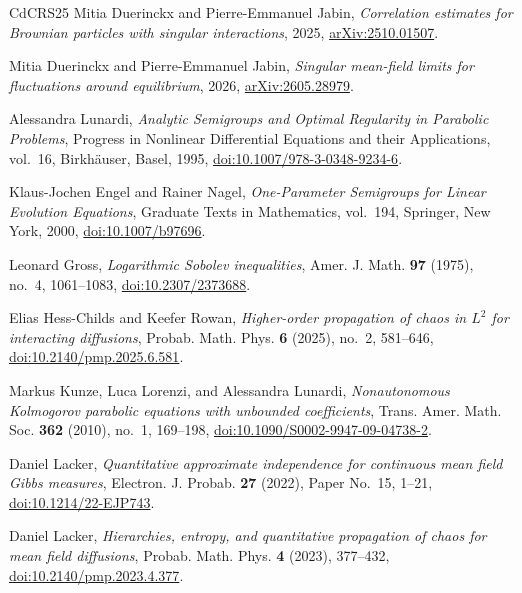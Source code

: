 \documentclass[11pt,reqno]{amsart}
\numberwithin{equation}{section}
\theoremstyle{plain}
\theoremstyle{remark}
\begin{document}
\begin{thebibliography}{CdCRS25}
Mitia Duerinckx and Pierre-Emmanuel Jabin, \emph{Correlation estimates for
  {B}rownian particles with singular interactions}, 2025,
  \href{https://arxiv.org/abs/2510.01507}{arXiv:2510.01507}.


Mitia Duerinckx and Pierre-Emmanuel Jabin, \emph{Singular mean-field limits for fluctuations around equilibrium},
  2026, \href{https://arxiv.org/abs/2605.28979}{arXiv:2605.28979}.


Alessandra Lunardi, \emph{Analytic Semigroups and Optimal Regularity in Parabolic Problems}, Progress in Nonlinear Differential Equations and their Applications, vol.~16, Birkh\"auser, Basel, 1995, \href{https://doi.org/10.1007/978-3-0348-9234-6}{doi:10.1007/978-3-0348-9234-6}.


Klaus-Jochen Engel and Rainer Nagel, \emph{One-Parameter Semigroups for Linear Evolution Equations}, Graduate Texts in Mathematics, vol.~194, Springer, New York, 2000, \href{https://doi.org/10.1007/b97696}{doi:10.1007/b97696}.


Leonard Gross, \emph{Logarithmic {S}obolev inequalities}, Amer. J. Math.
  \textbf{97} (1975), no.~4, 1061--1083,
  \href{https://doi.org/10.2307/2373688}{doi:10.2307/2373688}.


Elias Hess-Childs and Keefer Rowan, \emph{Higher-order propagation of chaos in
  {$L^2$} for interacting diffusions}, Probab. Math. Phys. \textbf{6} (2025),
  no.~2, 581--646,
  \href{https://doi.org/10.2140/pmp.2025.6.581}{doi:10.2140/pmp.2025.6.581}.


Markus Kunze, Luca Lorenzi, and Alessandra Lunardi, \emph{Nonautonomous Kolmogorov parabolic equations with unbounded coefficients}, Trans. Amer. Math. Soc. \textbf{362} (2010), no.~1, 169--198, \href{https://doi.org/10.1090/S0002-9947-09-04738-2}{doi:10.1090/S0002-9947-09-04738-2}.


Daniel Lacker, \emph{Quantitative approximate independence for continuous mean field Gibbs measures}, Electron. J. Probab. \textbf{27} (2022), Paper No.~15, 1--21,
\href{https://doi.org/10.1214/22-EJP743}{doi:10.1214/22-EJP743}.

Daniel Lacker, \emph{Hierarchies, entropy, and quantitative propagation of
  chaos for mean field diffusions}, Probab. Math. Phys. \textbf{4} (2023),
  377--432,
  \href{https://doi.org/10.2140/pmp.2023.4.377}{doi:10.2140/pmp.2023.4.377}.



\end{thebibliography}
\end{document}
